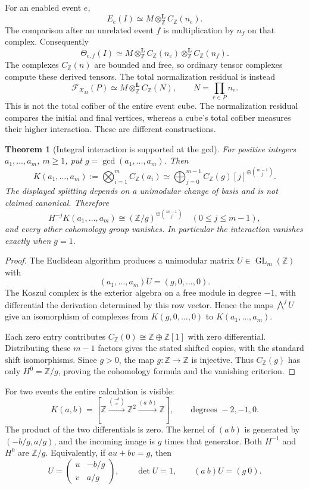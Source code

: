 \documentclass[11pt]{article}
\newtheorem{theorem}{Theorem}[section]
\theoremstyle{definition}
\theoremstyle{remark}
\begin{document}
For an enabled event $e$,
\[
 E_e(I)\simeq M\otimes^{\mathbf L}_{\mathbb Z}C_{\mathbb Z}(n_e).
\]
The comparison after an unrelated event $f$ is multiplication by $n_f$ on that complex. Consequently
\[
 \boxed{\Theta_{e,f}(I)\simeq
 M\otimes^{\mathbf L}_{\mathbb Z}
 C_{\mathbb Z}(n_e)\otimes^{\mathbf L}_{\mathbb Z}C_{\mathbb Z}(n_f).}
\]
The complexes $C_{\mathbb Z}(n)$ are bounded and free, so ordinary tensor complexes compute these derived tensors. The total normalization residual is instead
\[
 \mathcal F_{X_M}(P)\simeq
 M\otimes^{\mathbf L}_{\mathbb Z}C_{\mathbb Z}(N),
 \qquad N=\prod_{e\in P}n_e.
\]
This is not the total cofiber of the entire event cube. The normalization residual compares the initial and final vertices, whereas a cube's total cofiber measures their higher interaction. These are different constructions.

\begin{theorem}[Integral interaction is supported at the gcd]\label{thm:integral-gcd}
For positive integers $a_1,\ldots,a_m$, $m\ge1$, put $g=\gcd(a_1,\ldots,a_m)$. Then
\[
 K(a_1,\ldots,a_m):=
 \bigotimes_{i=1}^m C_{\mathbb Z}(a_i)
 \simeq\bigoplus_{j=0}^{m-1}
 C_{\mathbb Z}(g)[j]^{\oplus\binom{m-1}{j}}.
\]
The displayed splitting depends on a unimodular change of basis and is not claimed canonical. Therefore
\[
 H^{-j}K(a_1,\ldots,a_m)\cong
 (\mathbb Z/g)^{\oplus\binom{m-1}{j}}
 \quad(0\le j\le m-1),
\]
and every other cohomology group vanishes. In particular the interaction vanishes exactly when $g=1$.
\end{theorem}

\begin{proof}
The Euclidean algorithm produces a unimodular matrix $U\in\operatorname{GL}_m(\mathbb Z)$ with
\[
 (a_1,\ldots,a_m)U=(g,0,\ldots,0).
\]
The Koszul complex is the exterior algebra on a free module in degree $-1$, with differential the derivation determined by this row vector. Hence the maps $\bigwedge^jU$ give an isomorphism of complexes from $K(g,0,\ldots,0)$ to $K(a_1,\ldots,a_m)$.

Each zero entry contributes $C_{\mathbb Z}(0)\cong\mathbb Z\oplus\mathbb Z[1]$ with zero differential. Distributing these $m-1$ factors gives the stated shifted copies, with the standard shift isomorphisms. Since $g>0$, the map $g:\mathbb Z\to\mathbb Z$ is injective. Thus $C_{\mathbb Z}(g)$ has only $H^0=\mathbb Z/g$, proving the cohomology formula and the vanishing criterion.
\end{proof}

For two events the entire calculation is visible:
\[
 K(a,b)=\left[
 \mathbb Z\xrightarrow{\binom{-b}{a}}
 \mathbb Z^2\xrightarrow{(a\ \ b)}\mathbb Z
 \right],
 \qquad\text{degrees }-2,-1,0.
\]
The product of the two differentials is zero. The kernel of $(a\ b)$ is generated by $(-b/g,a/g)$, and the incoming image is $g$ times that generator. Both $H^{-1}$ and $H^0$ are $\mathbb Z/g$. Equivalently, if $au+bv=g$, then
\[
 U=\begin{pmatrix}u&-b/g\\v&a/g\end{pmatrix},
 \qquad\det U=1,
 \qquad(a\ b)U=(g\ 0).
\]
\end{document}
